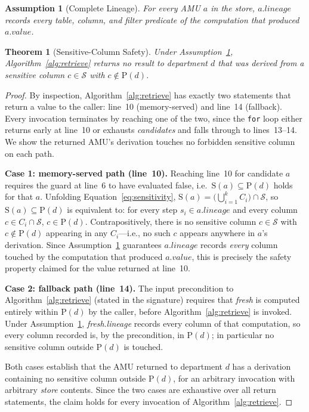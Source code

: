 \documentclass[nolineno]{ieeeaccess}
\newtheorem{theorem}{Theorem}
\newtheorem{assumption}{Assumption}
\begin{document}
\begin{assumption}[Complete Lineage]
\label{ass:complete}
For every AMU $a$ in the store, $a.\mathit{lineage}$ records every table,
column, and filter predicate of the computation that produced $a.\mathit{value}$.
\end{assumption}

\begin{theorem}[Sensitive-Column Safety]
\label{thm:safety}
Under Assumption~\ref{ass:complete}, Algorithm~\ref{alg:retrieve} returns no
result to department $d$ that was derived from a sensitive column
$c \in \mathcal{S}$ with $c \notin \mathrm{P}(d)$.
\end{theorem}

\begin{proof}
By inspection, Algorithm~\ref{alg:retrieve} has exactly two statements that
return a value to the caller: line~10 (memory-served) and line~14
(fallback). Every invocation terminates by reaching one of the two, since
the \texttt{for} loop either returns early at line~10 or exhausts
\textit{candidates} and falls through to lines~13--14. We show the returned
AMU's derivation touches no forbidden sensitive column on each path.

\smallskip\noindent\textbf{Case 1: memory-served path (line~10).}
Reaching line~10 for candidate $a$ requires the guard at line~6 to have
evaluated false, i.e.\ $\mathrm{S}(a) \subseteq \mathrm{P}(d)$ holds for that
$a$. Unfolding Equation~\ref{eq:sensitivity}, $\mathrm{S}(a) =
\bigl(\bigcup_{i=1}^{k} C_i\bigr) \cap \mathcal{S}$, so $\mathrm{S}(a)
\subseteq \mathrm{P}(d)$ is equivalent to: for every step $s_i \in
a.\mathit{lineage}$ and every column $c \in C_i \cap \mathcal{S}$, $c \in
\mathrm{P}(d)$. Contrapositively, there is no sensitive column $c \in
\mathcal{S}$ with $c \notin \mathrm{P}(d)$ appearing in any $C_i$---i.e., no
such $c$ appears anywhere in $a$'s derivation. Since
Assumption~\ref{ass:complete} guarantees $a.\mathit{lineage}$ records
\emph{every} column touched by the computation that produced $a.value$,
this is precisely the safety property claimed for the value returned at
line~10.

\smallskip\noindent\textbf{Case 2: fallback path (line~14).}
The input precondition to Algorithm~\ref{alg:retrieve} (stated in the
signature) requires that \textit{fresh} is computed entirely within
$\mathrm{P}(d)$ by the caller, before Algorithm~\ref{alg:retrieve} is
invoked. Under Assumption~\ref{ass:complete}, \textit{fresh}.\textit{lineage}
records every column of that computation, so every column recorded is, by
the precondition, in $\mathrm{P}(d)$; in particular no sensitive column
outside $\mathrm{P}(d)$ is touched.

\smallskip\noindent
Both cases establish that the AMU returned to department $d$ has a
derivation containing no sensitive column outside $\mathrm{P}(d)$, for an
arbitrary invocation with arbitrary \textit{store} contents. Since the two
cases are exhaustive over all return statements, the claim holds for every
invocation of Algorithm~\ref{alg:retrieve}.
\end{proof}
\end{document}

